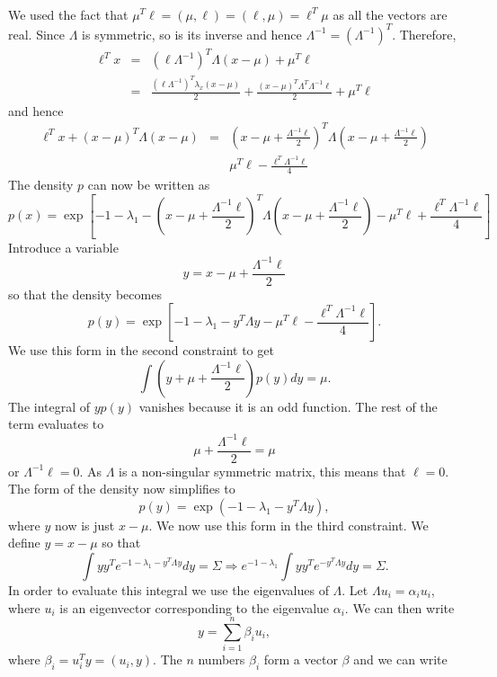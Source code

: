 \begin{enumerate}
\begin{eqnarray*}
\end{eqnarray*}
We used the fact that $\mu^T\ell = (\mu, \ell) = (\ell, \mu) = \ell^T\mu$ as all
the vectors are real. Since $\Lambda$ is symmetric, so is its inverse and hence $\Lambda^{-1}
= (\Lambda^{-1})^T$. Therefore,
\begin{eqnarray*}
\ell^T x &=& (\ell\Lambda^{-1})^T\Lambda(x - \mu) + \mu^T\ell \\
 &=& \frac{(\ell\Lambda^{-1})^T\lambda_x(x - \mu)}{2} + \frac{(x - \mu)^T\Lambda^T\Lambda^{-1}\ell}{2} + \mu^T\ell
\end{eqnarray*}
and hence
\begin{eqnarray*}
\ell^Tx + (x-\mu)^T\Lambda(x-\mu) &=& \left(x-\mu+\frac{\Lambda^{-1}\ell}{2}\right)^T\Lambda\left(x-\mu+\frac{\Lambda^{-1}\ell}{2}\right) \\
 & & \mu^T\ell - \frac{\ell^T\Lambda^{-1}\ell}{4}
\end{eqnarray*}
The density $p$ can now be written as
\[
p(x)=\exp\left[-1-\lambda_1 - \left(x-\mu+\frac{\Lambda^{-1}\ell}{2}\right)^T\Lambda\left(x-\mu+\frac{\Lambda^{-1}\ell}{2}\right)-\mu^T\ell+\frac{\ell^T\Lambda^{-1}\ell}{4}\right]
\]
Introduce a variable 
\[
y = x - \mu + \frac{\Lambda^{-1}\ell}{2}
\]
so that the density becomes
\[
p(y) = \exp\left[-1-\lambda_1-y^T\Lambda y - \mu^T\ell - \frac{\ell^T\Lambda^{-1}\ell}{4}\right].
\]
We use this form in the second constraint to get
\[
\int\left(y + \mu + \frac{\Lambda^{-1}\ell}{2}\right)p(y)dy = \mu.
\]
The integral of $yp(y)$ vanishes because it is an odd function. The rest of the term evaluates to
\[
\mu + \frac{\Lambda^{-1}\ell}{2} = \mu
\]
or $\Lambda^{-1}\ell = 0$. As $\Lambda$ is a non-singular symmetric matrix, this means that $\ell = 0$.
The form of the density now simplifies to
\[
p(y) = \exp\left(-1 - \lambda_1 - y^T\Lambda y\right),
\]
where $y$ now is just $x - \mu$. We now use this form in the third constraint. We define 
$y = x - \mu$ so that
\begin{equation}\label{c2pe18}
\int yy^Te^{-1 - \lambda_1 - y^T\Lambda y}dy = \Sigma \Rightarrow e^{-1-\lambda_1} \int yy^T e^{-y^T\Lambda y}dy = \Sigma.
\end{equation}
In order to evaluate this integral we use the eigenvalues of $\Lambda$. Let $\Lambda u_i = \alpha_i u_i$,
where $u_i$ is an eigenvector corresponding to the eigenvalue $\alpha_i$. We can then write 
\[
y = \sum_{i=1}^n \beta_i u_i,
\]
where $\beta_i = u_i^T y = (u_i, y)$. The $n$ numbers $\beta_i$ form a vector $\beta$ and we can write
\begin{equation}\label{c2pe19}

\end{equation}
\end{enumerate}

